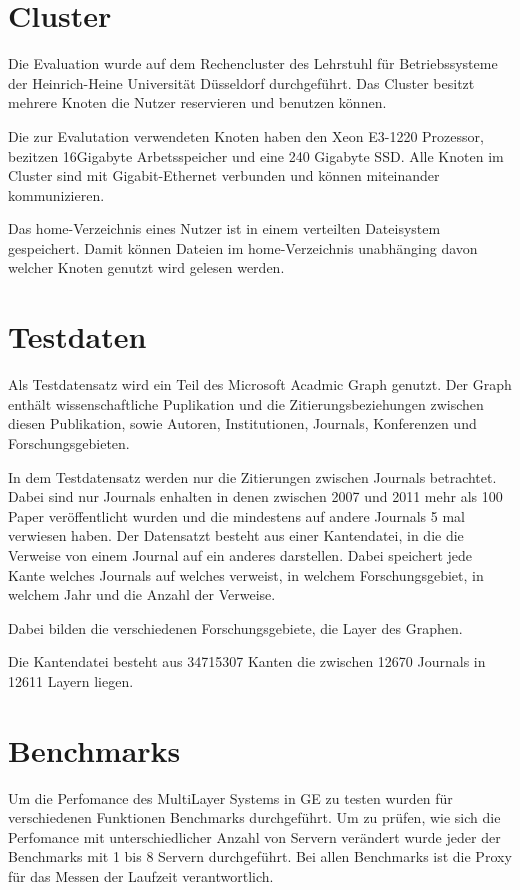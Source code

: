 
\section{Cluster}

Die Evaluation wurde auf dem Rechencluster des Lehrstuhl für Betriebssysteme der Heinrich-Heine Universität Düsseldorf durchgeführt.
Das Cluster besitzt mehrere Knoten die Nutzer reservieren und benutzen können.

Die zur Evalutation verwendeten Knoten haben den Xeon E3-1220 Prozessor, bezitzen 16Gigabyte Arbetsspeicher und eine 240 Gigabyte SSD.
Alle Knoten im Cluster sind mit Gigabit-Ethernet verbunden und können miteinander kommunizieren. 

Das home-Verzeichnis eines Nutzer ist in einem verteilten Dateisystem gespeichert. Damit können Dateien im home-Verzeichnis unabhänging davon welcher Knoten genutzt wird gelesen werden.

\section{Testdaten}


Als Testdatensatz wird ein Teil des Microsoft Acadmic Graph genutzt. Der Graph enthält wissenschaftliche Puplikation und die Zitierungsbeziehungen zwischen diesen Publikation, sowie Autoren, Institutionen, Journals, Konferenzen und Forschungsgebieten.

In dem Testdatensatz werden nur die Zitierungen zwischen Journals betrachtet. Dabei sind nur Journals enhalten in denen zwischen 2007 und 2011 mehr als 100 Paper veröffentlicht wurden und die mindestens auf andere Journals 5 mal verwiesen haben.
Der Datensatzt besteht aus einer Kantendatei, in die die Verweise von einem Journal auf ein anderes darstellen. Dabei speichert jede Kante welches Journals auf welches verweist, in welchem Forschungsgebiet, in welchem Jahr und die Anzahl der Verweise.

Dabei bilden die verschiedenen Forschungsgebiete, die Layer des Graphen. 

Die Kantendatei besteht aus 34715307 Kanten die zwischen 12670 Journals in 12611 Layern liegen.


\section{Benchmarks}

Um die Perfomance des MultiLayer Systems in GE zu testen wurden für verschiedenen Funktionen Benchmarks durchgeführt. Um zu prüfen, wie sich die Perfomance mit unterschiedlicher Anzahl von Servern verändert
wurde jeder der Benchmarks mit 1 bis 8 Servern durchgeführt. Bei allen Benchmarks ist die Proxy für das Messen der Laufzeit verantwortlich.

